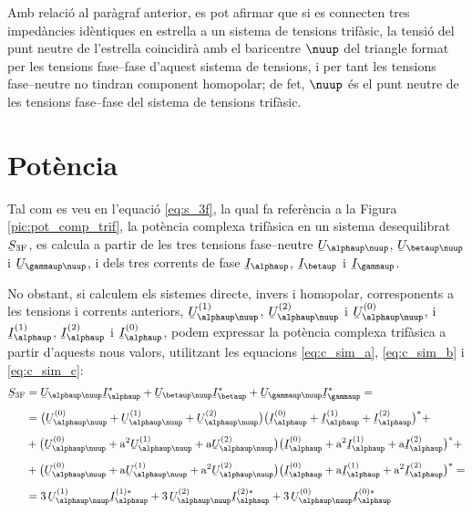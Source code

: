 Amb relaci\'{o} al par\`{a}graf anterior, es pot afirmar que si es
connecten tres imped\`{a}ncies id\`{e}ntiques en estrella a un sistema
de tensions trif\`{a}sic, la tensi\'{o} del punt neutre de l'estrella
coincidir\`{a} amb el baricentre $\nuup$ del triangle format per les tensions
fase--fase d'aquest sistema de tensions, i per tant les tensions fase--neutre no tindran
component homopolar; de fet, $\nuup$ \'{e}s el punt neutre de les tensions
fase--fase del sistema de tensions trif\`{a}sic.

\section{Pot\`{e}ncia} 

Tal com es veu en l'equaci\'{o} \eqref{eq:s_3f}, la qual fa refer\`{e}ncia a
la Figura \vref{pic:pot_comp_trif}, la pot\`{e}ncia complexa trif\`{a}sica
en un sistema desequilibrat $\cmplx{S}\ped{3F}$, es calcula a partir
de les tres tensions fase--neutre $\cmplx{U}_{\alphaup\nuup}$,
$\cmplx{U}_{\betaup\nuup}$ i $\cmplx{U}_{\gammaup\nuup}$, i dels tres
corrents de fase $\cmplx{I}_\alphaup$, $\cmplx{I}_\betaup$ i
$\cmplx{I}_\gammaup$.


No obstant, si calculem els sistemes directe, invers i homopolar,
corresponents a les tensions i corrents anteriors,
$\cmplx{U}_{\alphaup\nuup}\ap{(1)}$, $\cmplx{U}_{\alphaup\nuup}\ap{(2)}$ i
$\cmplx{U}_{\alphaup\nuup}\ap{(0)}$, i $\cmplx{I}_\alphaup\ap{(1)}$,
$\cmplx{I}_\alphaup\ap{(2)}$ i $\cmplx{I}_\alphaup\ap{(0)}$, podem
expressar la pot\`{e}ncia complexa trif\`{a}sica a partir d'aquests nous
valors, utilitzant les equacions \eqref{eq:c_sim_a},
\eqref{eq:c_sim_b} i \eqref{eq:c_sim_c}:
\begin{equation}
\begin{split}
   \cmplx{S}\ped{3F} &= \cmplx{U}_{\alphaup\nuup} \cmplx{I}_\alphaup^* +
   \cmplx{U}_{\betaup\nuup} \cmplx{I}_\betaup^* +  \cmplx{U}_{\gammaup\nuup} \cmplx{I}_\gammaup^* = \\[1ex]
   &= \big(\cmplx{U}_{\alphaup\nuup}^{(0)} + \cmplx{U}_{\alphaup\nuup}^{(1)} +
   \cmplx{U}_{\alphaup\nuup}^{(2)}\big) \big(\cmplx{I}_\alphaup^{(0)} + \cmplx{I}_\alphaup^{(1)} +
   \cmplx{I}_\alphaup^{(2)}\big)^* +  \\[1ex]
   &+ \big(\cmplx{U}_{\alphaup\nuup}^{(0)} + \au^2 \cmplx{U}_{\alphaup\nuup}^{(1)} +
   \au \cmplx{U}_{\alphaup\nuup}^{(2)} \big) \big(\cmplx{I}_\alphaup^{(0)} + \au^2 \cmplx{I}_\alphaup^{(1)}
    + \au \cmplx{I}_\alphaup^{(2)} \big)^* + \\[1ex]
   &+ \big(\cmplx{U}_{\alphaup\nuup}^{(0)} + \au \cmplx{U}_{\alphaup\nuup}^{(1)} + \au^2
   \cmplx{U}_{\alphaup\nuup}^{(2)} \big) \big(\cmplx{I}_\alphaup^{(0)} + \au
   \cmplx{I}_\alphaup^{(1)} + \au^2 \cmplx{I}_\alphaup^{(2)} \big)^* =  \\[1ex]
   &= 3\, \cmplx{U}_{\alphaup\nuup}^{(1)}  \cmplx{I}_\alphaup^{(1)*} +
   3\, \cmplx{U}_{\alphaup\nuup}^{(2)}  \cmplx{I}_\alphaup^{(2)*} +
   3\, \cmplx{U}_{\alphaup\nuup}^{(0)}  \cmplx{I}_\alphaup^{(0)*} \label{eq:c_sim_s}
\end{split}
\end{equation}

